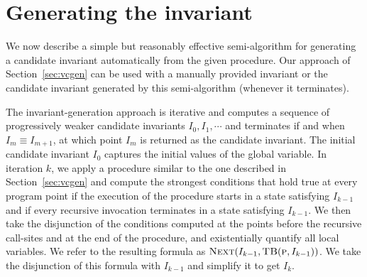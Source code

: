 \section{Generating the invariant}
\label{sec:invariant}

We now describe a simple but reasonably effective semi-algorithm for
generating a candidate invariant automatically from the given
procedure. Our approach of Section~\ref{sec:vcgen} can be used with a manually
provided invariant or the candidate invariant generated by this
semi-algorithm (whenever it terminates).

The invariant-generation approach is iterative and computes a sequence of progressively weaker
candidate invariants $I_0, I_1, \cdots$ and terminates if and when $I_m \equiv I_{m+1}$, at
which point $I_m$ is returned as the candidate invariant.
%
The initial candidate invariant $I_0$ captures the initial values of the global variable.
In  iteration $k$, we apply a procedure similar to the one described in Section~\ref{sec:vcgen} and
compute the strongest conditions that hold true at every program point if the execution of the
procedure starts in a state satisfying $I_{k-1}$ and if every recursive invocation terminates in a
state satisfying $I_{k-1}$. We then take the disjunction of the conditions computed at the points before the
recursive call-sites and at the end of the procedure, and existentially quantify all local variables.
We refer to the resulting formula as $\textsc{Next}(I_{k-1}, \textsc{TB}(\textsc{p},I_{k-1}))$.
We take the disjunction of this formula with $I_{k-1}$ and simplify it to get $I_k$.

%

